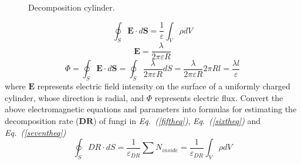 \begin{figure}[H]
  \centering
  \label{figure1}
  \caption{Decomposition cylinder.}
\end{figure}
\begin{equation}
  \label{secondeq}
  \oint_S \bm{E} \cdot d\bm{S}=\frac{1}{\varepsilon}\int_V \rho d V
\end{equation}
\begin{equation}
  \label{thirdeq}
  \bm{E}=\frac{\lambda}{2\pi \varepsilon R}
\end{equation}
\begin{equation}
  \label{fourtheq}
  \Phi = \oint_S \bm{E}\cdot d\bm{S} = \oint_S \frac{\lambda}{2\pi\varepsilon R}d S = \frac{\lambda}{2\pi\varepsilon R} 2\pi R l = \frac{\lambda l}{\varepsilon}
\end{equation}
where $\bm{E}$ represents electric field intensity on the surface of a uniformly charged cylinder, whose direction is radial, and $\Phi$ represents electric flux. Convert the above electromagnetic equations and parameters into formulas for estimating the decomposition rate ($\bm{DR}$) of fungi in \textit{Eq.~(\ref{fiftheq})}, \textit{Eq.~(\ref{sixtheq})} and \textit{Eq.~(\ref{seventheq})}
\begin{equation}
  \label{fiftheq}
  \oint_S DR\cdot dS = \frac{1}{\varepsilon_{DR}}\sum N_{inside} = \frac{1}{\varepsilon_{DR}} \int_V \rho dV
\end{equation}
